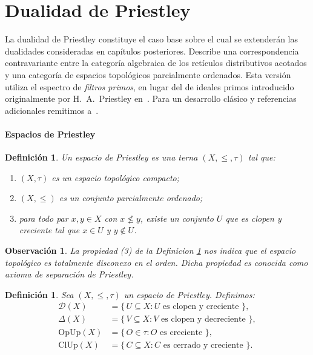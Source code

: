 \documentclass[12pt]{book}
\newtheorem{definition}[theorem]{Definición}
\newtheorem{remark}[theorem]{Observación}
\begin{document}
\section{Dualidad de Priestley}

La dualidad de Priestley constituye el caso base sobre el cual se extenderán las dualidades consideradas en capítulos posteriores.  
Describe una correspondencia contravariante entre la categoría algebraica de los retículos distributivos acotados y una categoría de espacios topológicos parcialmente ordenados.  
Esta versión utiliza el espectro de \emph{filtros primos}, en lugar del de ideales primos introducido originalmente por H.~A.~Priestley en~\cite{P}.  
Para un desarrollo clásico y referencias adicionales remitimos a~\cite{DP,CLP,SS}.

\paragraph{Espacios de Priestley}

\begin{definition}\label{def:espacio_priestley2} Un \emph{espacio de Priestley} es una terna \( (X,\leq,\tau) \) tal que:
\begin{enumerate}[\normalfont (1)]
  \item \( (X,\tau) \) es un espacio topológico compacto;
  \item \( (X,\leq) \) es un conjunto parcialmente ordenado;
  \item para todo par \( x,y\in X \) con \( x\nleq y \), existe un conjunto \( U \) que es clopen y creciente tal que \( x\in U \) y \( y\notin U \).
\end{enumerate}
\end{definition}

\begin{remark}
La propiedad (3) de la Definicion \ref{def:espacio_priestley2} nos indica que el espacio topológico es totalmente disconexo en el orden. Dicha propiedad es conocida como axioma de separación de Priestley.
\end{remark}

\begin{definition}\label{def:familias_Priestley}
Sea \( (X,\leq,\tau) \) un espacio de Priestley. Definimos:
\begin{align*}
\mathcal{D}(X) &= \{\, U\subseteq X : U \text{ es clopen y creciente } \},\\
\Delta(X)      &= \{\, V\subseteq X : V \text{ es clopen y decreciente } \},\\
\mathrm{OpUp}(X) &= \{\, O\in\tau : O \text{ es creciente } \},\\
\mathrm{ClUp}(X) &= \{\, C\subseteq X : C \text{ es cerrado y creciente } \}.
\end{align*}
\end{definition}
\end{document}
